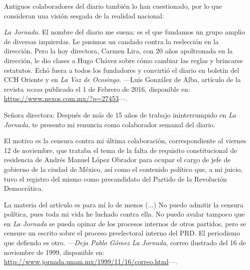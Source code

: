 \documentclass[letterpaper, 11pt]{book}
\theoremstyle{definition}
\theoremstyle{remark}
\begin{document}
Antiguos colaboradores del diario también lo han cuestionado, por lo que consideran una visión sesgada de la realidad nacional:



\begin{center}
    \begin{minipage}{0.9\linewidth}
        {\setlength{\parindent}{12pt}\small
	    \emph{La Jornada}. El nombre del diario me suena: es el que fundamos un grupo amplio de diversas izquierdas. Le pusimos un candado contra la reelección en la dirección. Pero la hoy directora, Carmen Lira, con 20 años apoltronada en la dirección, le dio clases a Hugo Chávez sobre cómo cambiar las reglas y brincarse estatutos. Echó fuera a todos los fundadores y convirtió el diario en boletín del CCH Oriente y en \emph{La Voz de Ocosingo}.  \normalsize ---Luis González de Alba, artículo de la revista \emph{nexos} publicado el 1 de Febrero de 2016, disponible en: \url{https://www.nexos.com.mx/?p=27453}---.
        }
    \end{minipage}
\end{center}


\begin{center}
    \begin{minipage}{0.9\linewidth}
        {\setlength{\parindent}{12pt}\small
	    Señora directora: Después de más de 15 años de trabajo ininterrumpido en \emph{La Jornada}, te presento mi renuncia como colaborador semanal del diario.
	    
	    El motivo es la censura contra mi última colaboración, correspondiente al viernes 12 de noviembre, que trataba el tema de la falta de requisito constitucional de residencia de Andrés Manuel López Obrador para ocupar el cargo de jefe de gobierno de la ciudad de México, así­ como el contenido político que, a mi juicio, tuvo el registro del mismo como precandidato del Partido de la Revolución Democrática.
	    
	    La materia del artí­culo es para mí lo de menos (...) No puedo admitir la censura política, pues toda mi vida he luchado contra ella. No puedo avalar tampoco que en \emph{La Jornada} se pueda opinar de los procesos internos de otros partidos, pero se censure un escrito sobre el proceso preelectoral interno del PRD. El periodismo que defiendo es otro.  \normalsize ---\emph{Deja Pablo Gómez La Jornada}, correo ilustrado del 16 de noviembre de 1999, disponible en: \url{http://www.jornada.unam.mx/1999/11/16/correo.html}---.
        }
    \end{minipage}
\end{center}
\end{document}
